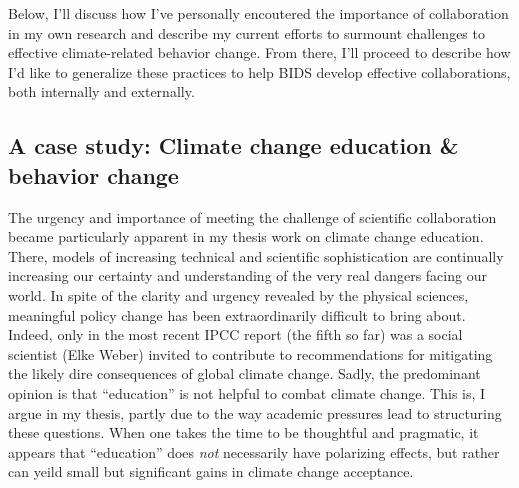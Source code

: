 
Below, I'll discuss how I've personally encoutered the importance of
collaboration in my own research and describe my current efforts to surmount
challenges to effective climate-related behavior change. From there, I'll
proceed to describe how I'd like to generalize these practices to help BIDS
develop effective collaborations, both internally and externally.

\subsection*{A case study: Climate change education \& behavior change}


The urgency and importance of meeting the challenge of scientific collaboration
became particularly apparent in my thesis work on climate change education.
There, models of increasing technical and scientific sophistication are
continually increasing our certainty and understanding of the very real dangers
facing our world. In spite of the clarity and urgency revealed by the physical
sciences, meaningful policy change has been extraordinarily difficult to bring
about. Indeed, only in the most recent IPCC report (the fifth so far) was a
social scientist (Elke Weber) invited to contribute to recommendations for
mitigating the likely dire consequences of global climate change. Sadly, the
predominant opinion is that “education” is not helpful to combat climate change.
This is, I argue in my thesis, partly due to the way academic pressures lead to
structuring these questions. When one takes the time to be thoughtful and
pragmatic, it appears that “education” does \emph{not} necessarily have
polarizing effects, but rather can yeild small but significant gains in climate
change acceptance.


